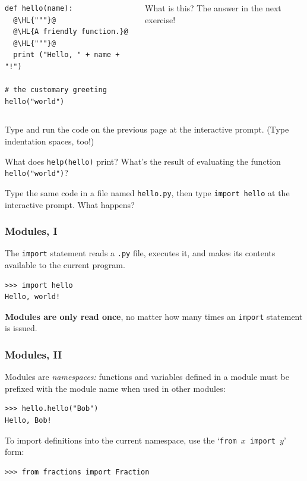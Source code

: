 \documentclass[english,serif,mathserif,xcolor=pdftex,dvipsnames,table]{beamer}
\begin{document}
\begin{frame}[fragile]
  \begin{columns}[t]
    \begin{column}{0.5\textwidth}
\begin{lstlisting}
def hello(name):
  @\HL{"""}@
  @\HL{A friendly function.}@
  @\HL{"""}@
  print ("Hello, " + name + "!")

# the customary greeting
hello("world")
\end{lstlisting}
    \end{column}
    \begin{column}{0.5\textwidth}
      \raggedleft
      What is this? The answer in the next exercise!
    \end{column}
  \end{columns}
\end{frame}

\begin{frame}
  \begin{exercise}
    Type and run the code on the previous page at the interactive
    prompt. (Type indentation spaces, too!)

    What does \texttt{help(hello)} print?
    What's the result of evaluating the function \texttt{hello("world")}?
  \end{exercise}

  \+
  \begin{exercise}
    Type the same code in a file named \texttt{hello.py}, then type
    \texttt{import hello} at the interactive prompt.
    What happens?
  \end{exercise}
\end{frame}


\begin{frame}[fragile]
  \frametitle{Modules, I}
  The \texttt{import} statement reads a \texttt{.py} file, executes
  it, and makes its contents available to the current program.
\begin{lstlisting}
>>> import hello
Hello, world!
\end{lstlisting}

  \+
  \textbf{Modules are only read once}, no matter how many times an
  \texttt{import} statement is issued.
\end{frame}


\begin{frame}[fragile]
  \frametitle{Modules, II}
  Modules are \emph{namespaces:} functions and variables defined in
  a module must be prefixed with the module name when used in other
  modules:
\begin{lstlisting}
>>> hello.hello("Bob")
Hello, Bob!
\end{lstlisting}

  \+
  To import definitions into the current namespace, use the
  `\texttt{from $x$ import $y$}' form:
\begin{lstlisting}
>>> from fractions import Fraction
\end{lstlisting}
\end{frame}
\end{document}

